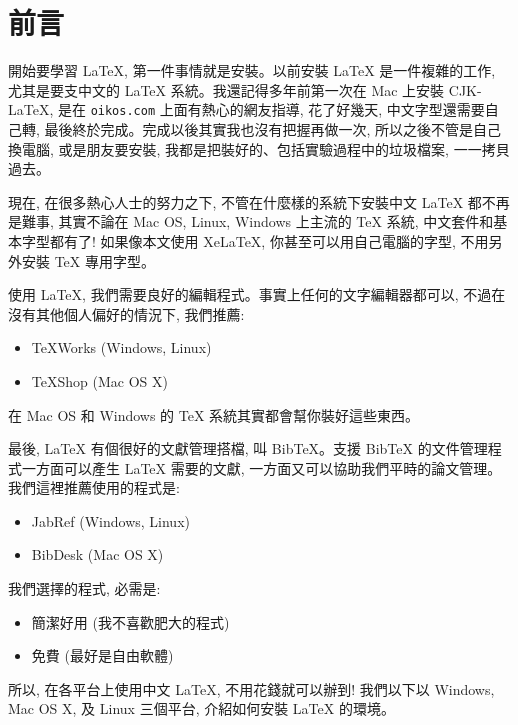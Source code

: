 \documentclass[12pt]{report}
\title{\hei{中英文 \LaTeX{} 安裝與應用}}
\author{蔡炎龍\\政治大學應用數學系}
\date{2014 年 ver1.0}
\newcommand{\cmd}{\texttt}
\begin{document}
\maketitle


\tableofcontents
\chapter{前言}
開始要學習 \LaTeX, 第一件事情就是安裝。以前安裝 \LaTeX{} 是一件複雜的工作, 尤其是要支中文的 \LaTeX{} 系統。我還記得多年前第一次在 Mac 上安裝 CJK-\LaTeX, 是在 \cmd{oikos.com} 上面有熱心的網友指導, 花了好幾天, 中文字型還需要自己轉, 最後終於完成。完成以後其實我也沒有把握再做一次, 所以之後不管是自己換電腦, 或是朋友要安裝, 我都是把裝好的、包括實驗過程中的垃圾檔案, 一一拷貝過去。

現在, 在很多熱心人士的努力之下, 不管在什麼樣的系統下安裝中文 \LaTeX{} 都不再是難事, 其實不論在 Mac OS, Linux, Windows 上主流的 \TeX{} 系統, 中文套件和基本字型都有了! 如果像本文使用 Xe\LaTeX, 你甚至可以用自己電腦的字型, 不用另外安裝 \TeX{} 專用字型。

使用 \LaTeX, 我們需要良好的編輯程式。事實上任何的文字編輯器都可以, 不過在沒有其他個人偏好的情況下, 我們推薦:

\begin{itemize}
\item TeXWorks (Windows, Linux)
\item TeXShop (Mac OS X)
\end{itemize}

在 Mac OS 和 Windows 的 TeX{} 系統其實都會幫你裝好這些東西。

最後, \LaTeX{} 有個很好的文獻管理搭檔, 叫 Bib\TeX{}。支援 Bib\TeX{} 的文件管理程式一方面可以產生 \LaTeX{} 需要的文獻, 一方面又可以協助我們平時的論文管理。我們這裡推薦使用的程式是:
\begin{itemize}
\item JabRef (Windows, Linux)
\item BibDesk (Mac OS X)
\end{itemize}

我們選擇的程式, 必需是:
\begin{itemize}
\item 簡潔好用 (我不喜歡肥大的程式)
\item 免費 (最好是自由軟體)
\end{itemize}

所以, 在各平台上使用中文 \LaTeX, 不用花錢就可以辦到! 我們以下以 Windows, Mac OS X, 及 Linux 三個平台, 介紹如何安裝 \LaTeX{} 的環境。
\end{document}
